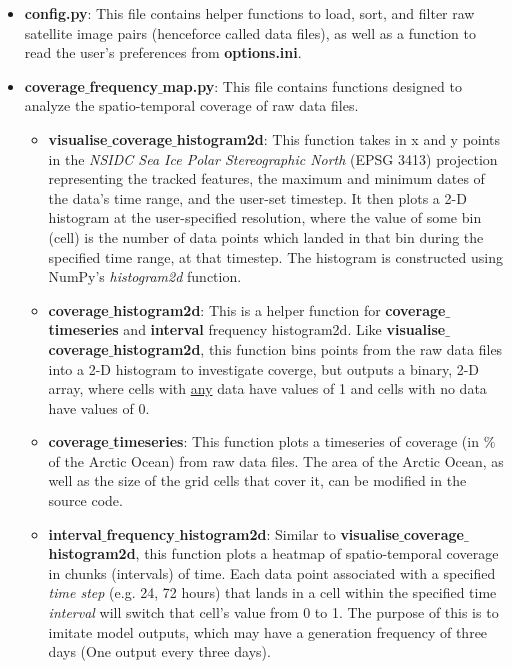 \documentclass[12pt]{article}
\begin{document}
\begin{itemize}
    \item \textbf{config.py}: This file contains helper functions to load, sort, and filter raw satellite image pairs (henceforce called data files), as well as a function to read the user's preferences from \textbf{options.ini}.
    
    \item \textbf{coverage$\_$frequency$\_$map.py}: This file contains functions designed to analyze the spatio-temporal coverage of raw data files.

        \begin{itemize}
            \item \textbf{visualise$\_$coverage$\_$histogram2d}: This function takes in x and y points in the \textit{NSIDC Sea Ice Polar Stereographic North} (EPSG 3413) projection representing the tracked features, the maximum and minimum dates of the data's time range, and the user-set timestep. It then plots a 2-D histogram at the user-specified resolution, where the value of some bin (cell) is the number of data points which landed in that bin during the specified time range, at that timestep. The histogram is constructed using NumPy's \textit{histogram2d} function.
            
            \item \textbf{coverage$\_$histogram2d}: This is a helper function for \textbf{coverage$\_$timeseries} and \textbf{interval} frequency histogram2d. Like \textbf{visualise$\_$coverage$\_$histogram2d}, this function bins points from the raw data files into a 2-D histogram to investigate coverge, but outputs a binary, 2-D array, where cells with \underline{any} data have values of 1 and cells with no data have values of 0.
            
            \item \textbf{coverage$\_$timeseries}: This function plots a timeseries of coverage (in $\%$ of the Arctic Ocean) from raw data files. The area of the Arctic Ocean, as well as the size of the grid cells that cover it, can be modified in the source code. 
            
            \item \textbf{interval$\_$frequency$\_$histogram2d}: Similar to \textbf{visualise$\_$coverage$\_$histogram2d}, this function plots a heatmap of spatio-temporal coverage in chunks (intervals) of time. Each data point associated with a specified \textit{time step} (e.g. 24, 72 hours) that lands in a cell within the specified time \textit{interval} will switch that cell's value from 0 to 1. The purpose of this is to imitate model outputs, which may have a generation frequency of three days (One output every three days). 
        \end{itemize}


\end{itemize}
\end{document}
